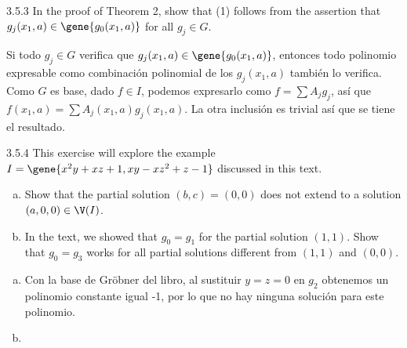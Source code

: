 \documentclass[twoside]{article}
\begin{document}
\newpage

\begin{ejercicio}{3.5.3}
In the proof of Theorem 2, show that (1) follows from the assertion that $g_j(x_1,a) \in \gene{g_0(x_1,a)}$ for all $g_j \in G$.
\end{ejercicio}
\begin{solucion}
Si todo $g_j \in G$ verifica que $g_j(x_1,a) \in \gene{g_0(x_1,a)}$, entonces todo polinomio expresable como combinación polinomial de los $g_j(x_1,a)$ también lo verifica. Como $G$ es base, dado $f\in I$, podemos expresarlo como $f=\sum A_jg_j$, así que $f(x_1,a)=\sum A_j(x_1,a)g_j(x_1,a)$. La otra inclusión es trivial así que se tiene el resultado. 
\end{solucion}
\newpage

\begin{ejercicio}{3.5.4}
This exercise will explore the example $I = \gene{x^2y+xz+1, xy-xz^2+z-1}$ discussed in this text.
\begin{enumerate}[a.]
\item Show that the partial solution $(b,c) = (0,0)$ does not extend to a solution $(a,0,0) \in \V(I)$.
\item In the text, we showed that $g_0 = g_1$ for the partial solution $(1,1)$.
Show that $g_0 = g_3$ works for all partial solutions different from $(1,1)$ and $(0,0)$.
\end{enumerate}
\end{ejercicio}
\begin{solucion}
\begin{enumerate}[a.]
\item Con la base de Gröbner del libro, al sustituir $y=z=0$ en $g_2$ obtenemos un polinomio constante igual -1, por lo que no hay ninguna solución para este polinomio. 
\item 
\end{enumerate}
\end{solucion}

\newpage
\end{document}
